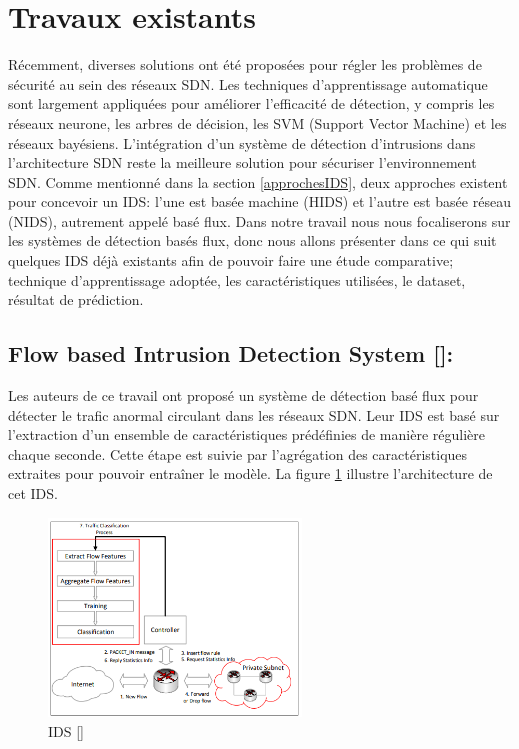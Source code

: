 \section{Travaux existants}
Récemment, diverses solutions ont été proposées pour régler les problèmes de sécurité au sein des réseaux SDN. Les techniques d’apprentissage automatique sont largement appliquées pour améliorer l’efficacité de détection, y compris les réseaux neurone, les arbres de décision, les SVM (Support Vector Machine) et les réseaux bayésiens. L'intégration d'un système de détection d'intrusions dans l'architecture SDN reste la meilleure solution pour sécuriser l'environnement SDN. Comme mentionné dans la section \ref{approchesIDS}, deux approches existent pour concevoir un IDS: l'une est basée machine (HIDS) et l'autre est basée réseau (NIDS), autrement appelé basé flux. Dans notre travail nous nous focaliserons sur les systèmes de détection basés flux, donc nous allons présenter dans ce qui suit quelques IDS déjà existants afin de pouvoir faire une étude comparative; technique d'apprentissage adoptée, les caractéristiques utilisées, le dataset, résultat de prédiction.\\

\newpage
\subsection{Flow based Intrusion Detection System [\cite{11}]:}
Les auteurs de ce travail ont proposé un système de détection basé flux pour détecter le trafic anormal circulant dans les réseaux SDN. Leur IDS est basé sur l’extraction d’un ensemble de caractéristiques prédéfinies de manière régulière chaque seconde. Cette étape est suivie par l’agrégation des caractéristiques extraites pour pouvoir entraîner le modèle. La figure \ref{fig:NIDS1} illustre l'architecture de cet IDS.
\begin{figure}[h]
\centering
\includegraphics[width=0.6\textwidth]{Figures/NIDS1}
\decoRule
\caption{IDS [\cite{11}]}
\label{fig:NIDS1}
\end{figure}

